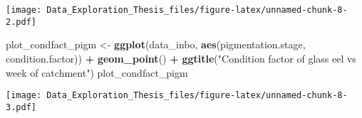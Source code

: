 \documentclass[]{article}
\newenvironment{Shaded}{\begin{snugshade}}{\end{snugshade}}
\newcommand{\KeywordTok}[1]{\textcolor[rgb]{0.13,0.29,0.53}{\textbf{#1}}}
\newcommand{\StringTok}[1]{\textcolor[rgb]{0.31,0.60,0.02}{#1}}
\newcommand{\OperatorTok}[1]{\textcolor[rgb]{0.81,0.36,0.00}{\textbf{#1}}}
\newcommand{\NormalTok}[1]{#1}
\begin{document}
\texttt{[image: Data\_Exploration\_Thesis\_files/figure-latex/unnamed-chunk-8-2.pdf]}

\begin{Shaded}
\begin{Highlighting}[]
\NormalTok{plot_condfact_pigm <-}\StringTok{ }\KeywordTok{ggplot}\NormalTok{(data_inbo, }\KeywordTok{aes}\NormalTok{(pigmentation.stage, condition.factor)) }\OperatorTok{+}
\StringTok{  }\KeywordTok{geom_point}\NormalTok{() }\OperatorTok{+}
\StringTok{  }\KeywordTok{ggtitle}\NormalTok{(}\StringTok{"Condition factor of glass eel vs week of catchment"}\NormalTok{) }
\NormalTok{plot_condfact_pigm}
\end{Highlighting}
\end{Shaded}

\texttt{[image: Data\_Exploration\_Thesis\_files/figure-latex/unnamed-chunk-8-3.pdf]}
\end{document}
